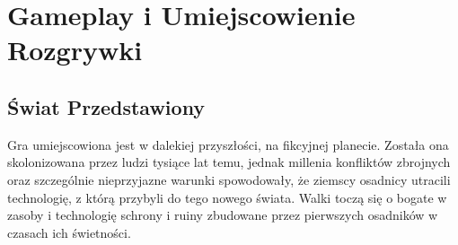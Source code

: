 \documentclass[a4paper]{scrreprt}
\begin{document}
\chapter{Gameplay i Umiejscowienie Rozgrywki}



\section{Świat Przedstawiony}
Gra umiejscowiona jest w dalekiej przyszłości, na fikcyjnej planecie. Została ona skolonizowana przez ludzi tysiące lat temu, jednak millenia konfliktów zbrojnych oraz szczególnie nieprzyjazne warunki spowodowały, że ziemscy osadnicy utracili technologię, z którą przybyli do tego nowego świata. Walki toczą się o bogate w zasoby i technologię schrony i ruiny zbudowane przez pierwszych osadników w czasach ich świetności.
\end{document}
